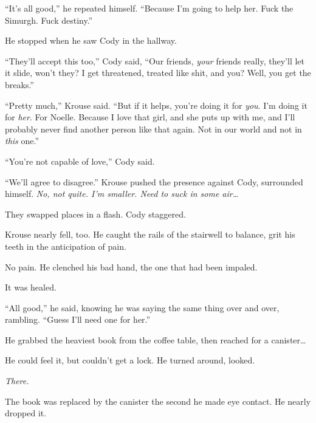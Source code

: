 ``It's all good,'' he repeated himself.  ``Because I'm going to help her.  Fuck the Simurgh.  Fuck destiny.''



He stopped when he saw Cody in the hallway.



``They'll accept this too,'' Cody said, ``Our friends, \emph{your} friends really, they'll let it slide, won't they?  I get threatened, treated like shit, and you?  Well, you get the breaks.''



``Pretty much,'' Krouse said.  ``But if it helps, you're doing it for \emph{you}.  I'm doing it for \emph{her}.  For Noelle.  Because I love that girl, and she puts up with me, and I'll probably never find another person like that again.  Not in our world and not in \emph{this} one.''



``You're not capable of love,'' Cody said.



``We'll agree to disagree.''  Krouse pushed the presence against Cody, surrounded himself.  \emph{No, not quite.  I'm smaller.  Need to suck in some air\ldots}



They swapped places in a flash.  Cody staggered.



Krouse nearly fell, too.  He caught the rails of the stairwell to balance, grit his teeth in the anticipation of pain.



No pain.  He clenched his bad hand, the one that had been impaled.



It was healed.



``All good,'' he said, knowing he was saying the same thing over and over, rambling.  ``Guess I'll need one for her.''



He grabbed the heaviest book from the coffee table, then reached for a canister\ldots



He could feel it, but couldn't get a lock.  He turned around, looked.



\emph{There.}



The book was replaced by the canister the second he made eye contact.  He nearly dropped it.



